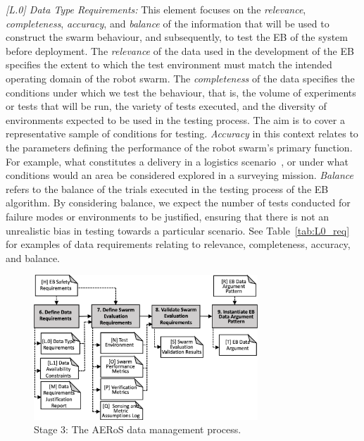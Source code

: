 \documentclass[runningheads]{llncs}
\begin{document}
\emph{[L.0] Data Type Requirements:}
This element focuses on the \emph{relevance}, \emph{completeness}, \emph{accuracy}, and \emph{balance} of the information that will be used to construct the swarm behaviour, and subsequently, to test the EB of the system before deployment. The \emph{relevance} of the data used in the development of the EB specifies the extent to which the test environment must match the intended operating domain of the robot swarm. The \emph{completeness} of the data specifies the conditions under which we test the behaviour, that is, the volume of experiments or tests that will be run, the variety of tests executed, and the diversity of environments expected to be used in the testing process. The aim is to cover a representative sample of conditions for testing. \emph{Accuracy} in this context relates to the parameters defining the performance of the robot swarm's primary function. For example, what constitutes a delivery in a logistics scenario~\cite{milner2022stochastic}, or under what conditions would an area be considered explored in a surveying mission. \emph{Balance} refers to the balance of the trials executed in the testing process of the EB algorithm. By considering balance, we expect the number of tests conducted for failure modes or environments to be justified, ensuring that there is not an unrealistic bias in testing towards a particular scenario. See Table~\ref{tab:L0_req} for examples of data requirements relating to relevance, completeness, accuracy, and balance.

\begin{figure}[!ht]
	\centering
	\includegraphics[width=0.75\textwidth]{figures/AERoS-Stage3.png}%
	\vspace{-2ex}
	\caption{Stage 3: The AERoS data management process.}
	\label{amlas-a-stage3}
	\vspace{-4ex}
\end{figure}
\end{document}
